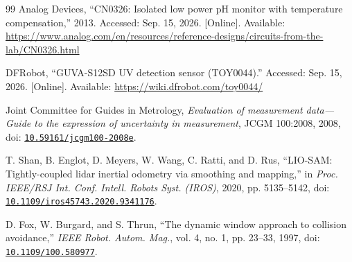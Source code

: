 \begin{thebibliography}{99}
Analog Devices, “CN0326: Isolated low power pH monitor with temperature compensation,” 2013. Accessed: Sep. 15, 2026. [Online]. Available: \url{https://www.analog.com/en/resources/reference-designs/circuits-from-the-lab/CN0326.html}

DFRobot, “GUVA-S12SD UV detection sensor (TOY0044).” Accessed: Sep. 15, 2026. [Online]. Available: \url{https://wiki.dfrobot.com/toy0044/}

Joint Committee for Guides in Metrology, \textit{Evaluation of measurement data---Guide to the expression of uncertainty in measurement}, JCGM 100:2008, 2008, doi: \href{https://doi.org/10.59161/jcgm100-2008e}{\nolinkurl{10.59161/jcgm100-2008e}}.

T. Shan, B. Englot, D. Meyers, W. Wang, C. Ratti, and D. Rus, “LIO-SAM: Tightly-coupled lidar inertial odometry via smoothing and mapping,” in \textit{Proc. IEEE/RSJ Int. Conf. Intell. Robots Syst. (IROS)}, 2020, pp. 5135--5142, doi: \href{https://doi.org/10.1109/iros45743.2020.9341176}{\nolinkurl{10.1109/iros45743.2020.9341176}}.

D. Fox, W. Burgard, and S. Thrun, “The dynamic window approach to collision avoidance,” \textit{IEEE Robot. Autom. Mag.}, vol. 4, no. 1, pp. 23--33, 1997, doi: \href{https://doi.org/10.1109/100.580977}{\nolinkurl{10.1109/100.580977}}.

\end{thebibliography}
